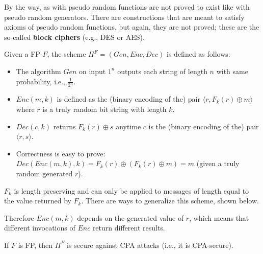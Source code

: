 \documentclass[../main]{subfiles}
\begin{document}
\noindent
By the way, as with pseudo random functions are not proved to exist like with pseudo random generators.
There are constructions that are meant to satisfy axioms of pseudo random functions, but again, they are not proved; these are the so-called \textbf{block ciphers} (e.g., DES or AES).

\begin{definition}
    Given a FP $F$, the scheme $\Pi^F = (Gen,Enc,Dec)$ is defined as follows:
    \begin{itemize}
        \item The algorithm $Gen$ on input $1^n$ outputs each string of length $n$ with same probability, i.e., $\frac{1}{2^n}$.
        \item $Enc(m,k)$ is defined as the (binary encoding of the) pair $\langle r, F_k(r)\oplus m \rangle$ where $r$ is a truly random bit string with length $k$.
        \item $Dec(c,k)$ returns $F_k(r)\oplus s$ anytime $c$ is the (binary encoding of the) pair $\langle r, s \rangle$.
        \item Correctness is easy to prove: $Dec(Enc(m,k),k)=F_k(r)\oplus(F_k(r)\oplus m)=m$ (given a truly random generated $r$).
    \end{itemize}
    $F_k$ is length preserving and can only be applied to messages of length equal to the value returned by $F_k$.
    There are ways to generalize this scheme, shown below.
\end{definition}
Therefore $Enc(m,k)$ depends on the generated value of $r$, which means that different invocations of $Enc$ return different results.

\begin{theorem}
	\label{theorem:fp-cpa-secure}
	If $F$ is FP, then $\Pi^F$ is secure against CPA attacks (i.e., it is CPA-secure).
\end{theorem}
\end{document}
